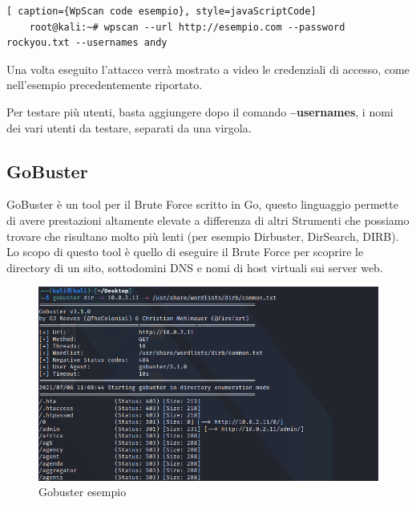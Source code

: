 \begin{lstlisting}[ caption={WpScan code esempio}, style=javaScriptCode]
    root@kali:~# wpscan --url http://esempio.com --password rockyou.txt --usernames andy
\end{lstlisting}

Una volta eseguito l'attacco verrà mostrato a video le credenziali di accesso, come nell'esempio precedentemente riportato.

Per testare più utenti, basta aggiungere dopo il comando \textbf{--usernames}, i nomi dei vari utenti da testare, separati da una virgola.

\newpage


\subsection{GoBuster}

GoBuster\cite{gobuster} è un tool per il Brute Force scritto in Go, questo linguaggio permette di avere prestazioni altamente elevate a differenza di altri Strumenti che possiamo trovare che risultano molto più lenti (per esempio Dirbuster, DirSearch, DIRB). Lo scopo di questo tool è quello di eseguire il Brute Force per scoprire le directory di un sito, sottodomini DNS e nomi di host virtuali sui server web.

\begin{figure}[htpb!]
    \centering
    \includegraphics[width=\linewidth]{Immagini/5/gobuster.png}
    \caption{Gobuster esempio}
    \label{fig:gobuster esempio}
\end{figure}

